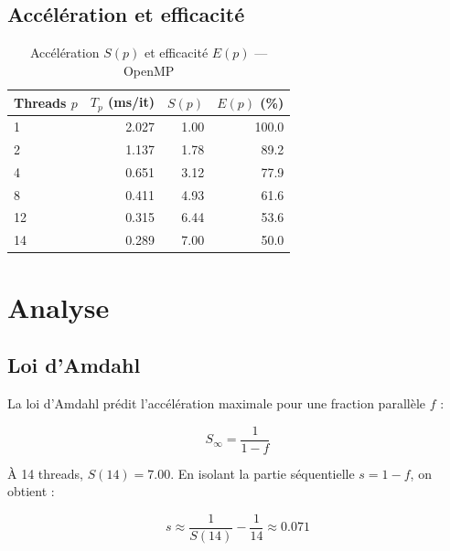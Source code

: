 \subsection{Accélération et efficacité}

\begin{table}[h]
\centering
\caption{Accélération $S(p)$ et efficacité $E(p)$ — OpenMP}
\label{tab:omp_speedup}
\begin{tabular}{lrrr}
\hline
\textbf{Threads $p$} & \textbf{$T_p$ (ms/it)} & \textbf{$S(p)$} & \textbf{$E(p)$ (\%)} \\
\hline
1  & 2.027 & 1.00 & 100.0 \\
2  & 1.137 & 1.78 &  89.2 \\
4  & 0.651 & 3.12 &  77.9 \\
8  & 0.411 & 4.93 &  61.6 \\
12 & 0.315 & 6.44 &  53.6 \\
14 & 0.289 & 7.00 &  50.0 \\
\hline
\end{tabular}
\end{table}


\section{Analyse}

\subsection{Loi d'Amdahl}

La loi d'Amdahl prédit l'accélération maximale pour une fraction parallèle $f$ :

\begin{equation}
    S_{\infty} = \frac{1}{1 - f}
    \label{eq:amdahl}
\end{equation}

À 14 threads, $S(14) = 7.00$. En isolant la partie séquentielle $s = 1 - f$, on obtient :

\[
    s \approx \frac{1}{S(14)} - \frac{1}{14} \approx 0.071
\]

